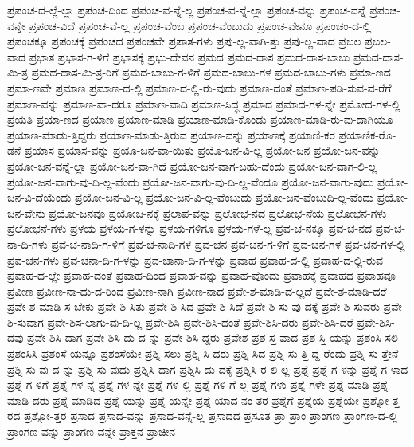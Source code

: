 {ಪ್ರಪಂಚ-ದ-ಲ್ಲೆ-ಲ್ಲಾ
ಪ್ರಪಂಚ-ದಿಂದ
ಪ್ರಪಂಚ-ವ-ನ್ನೆ-ಲ್ಲ
ಪ್ರಪಂಚ-ವ-ನ್ನೆ-ಲ್ಲಾ
ಪ್ರಪಂಚ-ವನ್ನು
ಪ್ರಪಂಚ-ವನ್ನೆ
ಪ್ರಪಂಚ-ವನ್ನೇ
ಪ್ರಪಂಚ-ವಿದೆ
ಪ್ರಪಂಚ-ವೆ-ಲ್ಲ
ಪ್ರಪಂಚ-ವೆಂಬ
ಪ್ರಪಂಚ-ವೆಂಬುದು
ಪ್ರಪಂಚ-ವೇನೂ
ಪ್ರಪಂಚಂ-ದ-ಲ್ಲಿ
ಪ್ರಪಂಚಕ್ಕೂ
ಪ್ರಪಂಚಕ್ಕೆ
ಪ್ರಪಂಚದ
ಪ್ರಪಂಚವೇ
ಪ್ರಪಾತ-ಗಳು
ಪ್ರಪು-ಲ್ಲ-ವಾಗಿ-ತ್ತು
ಪ್ರಪು-ಲ್ಲ-ವಾದ
ಪ್ರಬಲ
ಪ್ರಬಲ-ವಾದ
ಪ್ರಭಾತ
ಪ್ರಭಾಸ-ಗ-ಳಿಗೆ
ಪ್ರಭಾಸಕ್ಕೆ
ಪ್ರಭು-ದೇವನ
ಪ್ರಮದ
ಪ್ರಮದ-ದಾಸ
ಪ್ರಮದ-ದಾಸ-ಬಾಬು
ಪ್ರಮದ-ದಾಸ-ಮಿ-ತ್ರ
ಪ್ರಮದ-ದಾಸ-ಮಿ-ತ್ರ-ರಿಗೆ
ಪ್ರಮದ-ಬಾಬು-ಗ-ಳಿಗೆ
ಪ್ರಮದ-ಬಾಬು-ಗಳ
ಪ್ರಮದ-ಬಾಬು-ಗಳು
ಪ್ರಮಾ-ಣದ
ಪ್ರಮಾ-ಣವೇ
ಪ್ರಮಾಣ
ಪ್ರಮಾಣ-ದ-ಲ್ಲಿ
ಪ್ರಮಾಣ-ದ-ಲ್ಲಿ-ರು-ವುದು
ಪ್ರಮಾಣ-ದಂತೆ
ಪ್ರಮಾಣ-ಪಡಿ-ಸುವ-ವ-ರೆಗೆ
ಪ್ರಮಾಣ-ವನ್ನು
ಪ್ರಮಾಣ-ವಾ-ದರೂ
ಪ್ರಮಾಣ-ವಾದಿ
ಪ್ರಮಾಣ-ಸಿದ್ಧ
ಪ್ರಮಾದ
ಪ್ರಮಾದ-ಗಳ-ನ್ನೇ
ಪ್ರಮೋದ-ಗಳ-ಲ್ಲಿ
ಪ್ರಯತಿ
ಪ್ರಯಾ-ಣದ
ಪ್ರಯಾಣ
ಪ್ರಯಾಣ-ಮಾಡಿ
ಪ್ರಯಾಣ-ಮಾಡಿ-ಕೊಂಡು
ಪ್ರಯಾಣ-ಮಾಡಿ-ರು-ವು-ದಾಗಿಯೂ
ಪ್ರಯಾಣ-ಮಾಡು-ತ್ತಿದ್ದರು
ಪ್ರಯಾಣ-ಮಾಡು-ತ್ತಿರುವ
ಪ್ರಯಾಣ-ವನ್ನು
ಪ್ರಯಾಣಕ್ಕೆ
ಪ್ರಯಾಣಿ-ಕರ
ಪ್ರಯಾಣಿಕ-ರೊ-ಡನೆ
ಪ್ರಯಾಸ
ಪ್ರಯಾಸ-ವನ್ನು
ಪ್ರಯೊ-ಜನ-ವಾ-ಯಿತು
ಪ್ರಯೊ-ಜನ-ವಿ-ಲ್ಲ
ಪ್ರಯೋ-ಜನ
ಪ್ರಯೋ-ಜನ-ವನ್ನು
ಪ್ರಯೋ-ಜನ-ವನ್ನೆ-ಲ್ಲಾ
ಪ್ರಯೋ-ಜನ-ವಾ-ಗಿದೆ
ಪ್ರಯೋ-ಜನ-ವಾಗ-ಬಹು-ದೆಂದು
ಪ್ರಯೋ-ಜನ-ವಾಗ-ಲಿ-ಲ್ಲ
ಪ್ರಯೋ-ಜನ-ವಾಗು-ವು-ದಿ-ಲ್ಲ-ವೆಂದು
ಪ್ರಯೋ-ಜನ-ವಾಗು-ವು-ದಿ-ಲ್ಲ-ವೆಂದೂ
ಪ್ರಯೋ-ಜನ-ವಾಗು-ವುದು
ಪ್ರಯೋ-ಜನ-ವಿ-ದೆಯೆಂದು
ಪ್ರಯೋ-ಜನ-ವಿ-ಲ್ಲ
ಪ್ರಯೋ-ಜನ-ವಿ-ಲ್ಲ-ವೆಂಬುದು
ಪ್ರಯೋ-ಜನ-ವೆಂಬುದಿ-ಲ್ಲ-ವೆಂದು
ಪ್ರಯೋ-ಜನ-ವೇನು
ಪ್ರಯೋ-ಜನವೂ
ಪ್ರಯೋಜ-ನಕ್ಕೆ
ಪ್ರಲಾಪ-ವನ್ನು
ಪ್ರಲೋಭ-ನದ
ಪ್ರಲೋಭ-ನೆಯ
ಪ್ರಲೋಭನ-ಗಳು
ಪ್ರಲೋಭನೆ-ಗಳು
ಪ್ರಳಯ
ಪ್ರಳಯ-ಗ-ಳನ್ನು
ಪ್ರಳಯ-ಗಳಿಗೂ
ಪ್ರಳಯ-ಗಳೆ-ಲ್ಲ
ಪ್ರವ-ಚ-ನಕ್ಕೂ
ಪ್ರವ-ಚ-ನದ
ಪ್ರವ-ಚ-ನಾ-ದಿ-ಗಳು
ಪ್ರವ-ಚ-ನಾದಿ-ಗ-ಳಿಗೆ
ಪ್ರವ-ಚ-ನಾದಿ-ಗಳ
ಪ್ರವ-ಚನ
ಪ್ರವ-ಚನ-ಗ-ಳಿಗೆ
ಪ್ರವ-ಚನ-ಗಳ
ಪ್ರವ-ಚನ-ಗಳ-ಲ್ಲಿ
ಪ್ರವ-ಚನ-ಗಳು
ಪ್ರವ-ಚನಾ-ದಿ-ಗ-ಳನ್ನು
ಪ್ರವ-ಚಾನಾ-ದಿ-ಗ-ಳನ್ನು
ಪ್ರವಾಹ
ಪ್ರವಾಹ-ದ-ಲ್ಲಿ
ಪ್ರವಾಹ-ದ-ಲ್ಲಿ-ರುವ
ಪ್ರವಾಹ-ದ-ಲ್ಲೇ
ಪ್ರವಾಹ-ದಂತೆ
ಪ್ರವಾಹ-ದಿಂದ
ಪ್ರವಾಹ-ವನ್ನು
ಪ್ರವಾಹ-ವೊಂದು
ಪ್ರವಾಹಕ್ಕೆ
ಪ್ರವಾಹದ
ಪ್ರವಾಹವೂ
ಪ್ರವೀಣ
ಪ್ರವೀಣ-ನಾ-ದು-ದ-ರಿಂದ
ಪ್ರವೀಣ-ನಾಗಿ
ಪ್ರವೀಣ-ನಾದ
ಪ್ರವೇ-ಶ-ಮಾಡಿ-ದ-ಲ್ಲದೆ
ಪ್ರವೇ-ಶ-ಮಾಡಿ-ದರೆ
ಪ್ರವೇ-ಶ-ಮಾಡಿ-ಸ-ಬೇಕು
ಪ್ರವೇ-ಶಿ-ಸಿತು
ಪ್ರವೇ-ಶಿ-ಸಿದ
ಪ್ರವೇ-ಶಿ-ಸಿದೆ
ಪ್ರವೇ-ಶಿ-ಸು-ವು-ದಕ್ಕೆ
ಪ್ರವೇ-ಶಿ-ಸುವರು
ಪ್ರವೇ-ಶಿ-ಸುವಾಗ
ಪ್ರವೇ-ಶಿಸ-ಲಾಗು-ವು-ದಿ-ಲ್ಲ
ಪ್ರವೇ-ಶಿಸಿ
ಪ್ರವೇ-ಶಿಸಿ-ದಂತೆ
ಪ್ರವೇ-ಶಿಸಿ-ದರು
ಪ್ರವೇ-ಶಿಸಿ-ದರೆ
ಪ್ರವೇ-ಶಿಸಿ-ದವು
ಪ್ರವೇ-ಶಿಸಿ-ದಾಗ
ಪ್ರವೇ-ಶಿಸಿ-ದು-ದ-ನ್ನು
ಪ್ರವೇ-ಶಿಸಿ-ದ್ದರು
ಪ್ರವೇಶ
ಪ್ರಶ-ಸ್ತ-ವಾದ
ಪ್ರಶ-ಸ್ತಿ-ಯನ್ನು
ಪ್ರಶಂಸಿ-ಸಲಿ
ಪ್ರಶಂಸಿಸಿ
ಪ್ರಶಂಸೆ-ಯನ್ನೂ
ಪ್ರಶಂಸೆಯೇ
ಪ್ರಶ್ನಿ-ಸಲು
ಪ್ರಶ್ನಿ-ಸಿ-ದರು
ಪ್ರಶ್ನಿ-ಸಿದ
ಪ್ರಶ್ನಿ-ಸು-ತ್ತಿ-ದ್ದ-ರೆಂದು
ಪ್ರಶ್ನಿ-ಸು-ತ್ತೇನೆ
ಪ್ರಶ್ನಿ-ಸು-ವು-ದ-ನ್ನು
ಪ್ರಶ್ನಿ-ಸು-ವುದು
ಪ್ರಶ್ನಿಸಿ-ದಾಗ
ಪ್ರಶ್ನಿಸಿ-ದು-ದಕ್ಕೆ
ಪ್ರಶ್ನಿಸಿ-ರ-ಲಿ-ಲ್ಲ
ಪ್ರಶ್ನೆ
ಪ್ರಶ್ನೆ-ಗ-ಳನ್ನು
ಪ್ರಶ್ನೆ-ಗ-ಳಾದ
ಪ್ರಶ್ನೆ-ಗ-ಳಿಗೆ
ಪ್ರಶ್ನೆ-ಗಳ-ನ್ನೆ
ಪ್ರಶ್ನೆ-ಗಳ-ನ್ನೇ
ಪ್ರಶ್ನೆ-ಗಳ-ಲ್ಲಿ
ಪ್ರಶ್ನೆ-ಗಳಿ-ಗೆ-ಲ್ಲ
ಪ್ರಶ್ನೆ-ಗಳು
ಪ್ರಶ್ನೆ-ಗಳೇ
ಪ್ರಶ್ನೆ-ಮಾಡಿ
ಪ್ರಶ್ನೆ-ಮಾಡಿ-ದರು
ಪ್ರಶ್ನೆ-ಮಾಡಿದ
ಪ್ರಶ್ನೆ-ಯನ್ನು
ಪ್ರಶ್ನೆ-ಯನ್ನೇ
ಪ್ರಶ್ನೆ-ಯಾದ-ನಂ-ತರ
ಪ್ರಶ್ನೆಗೆ
ಪ್ರಶ್ನೆಯ
ಪ್ರಶ್ನೆಯೇ
ಪ್ರಶ್ನೋ-ತ್ತ-ರದ
ಪ್ರಶ್ನೋ-ತ್ತರ
ಪ್ರಸಾದ
ಪ್ರಸಾದ-ವನ್ನು
ಪ್ರಸಾದ-ವನ್ನೆ-ಲ್ಲ
ಪ್ರಸಾದದ
ಪ್ರಸೂತ
ಪ್ರಾ
ಪ್ರಾಂ
ಪ್ರಾಂಗಣ
ಪ್ರಾಂಗಣ-ದ-ಲ್ಲಿ
ಪ್ರಾಂಗಣ-ವನ್ನು
ಪ್ರಾಂಗಣ-ವನ್ನೇ
ಪ್ರಾಕ್ತನ
ಪ್ರಾಚೀನ
}
